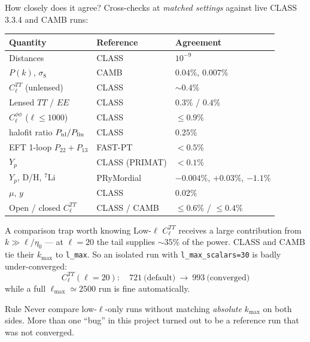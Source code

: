 \documentclass[10pt,aspectratio=43]{beamer}
\newcommand{\cl}{C_\ell}
\begin{document}
\begin{frame}{How closely does it agree?}
  Cross-checks at \emph{matched settings} against live CLASS 3.3.4 and CAMB runs:
  \renewcommand{\arraystretch}{1.2}
  \begin{center}\small
  \begin{tabular}{@{}lll@{}}
    \toprule
    \textbf{Quantity} & \textbf{Reference} & \textbf{Agreement} \\
    \midrule
    Distances                 & CLASS  & $10^{-9}$ \\
    $P(k)$, $\sigma_8$        & CAMB   & $0.04\%$, $0.007\%$ \\
    $\cl^{TT}$ (unlensed)     & CLASS  & $\sim0.4\%$ \\
    Lensed $TT$ / $EE$        & CLASS  & $0.3\%$ / $0.4\%$ \\
    $\cl^{\phi\phi}$ ($\ell\le1000$) & CLASS & $\le0.9\%$ \\
    halofit ratio $P_{\rm nl}/P_{\rm lin}$ & CLASS & $0.25\%$ \\
    EFT 1-loop $P_{22}+P_{13}$ & FAST-PT & $<0.5\%$ \\
    $Y_p$                     & CLASS (PRIMAT) & $<0.1\%$ \\
    $Y_p$, D/H, $^7$Li        & PRyMordial & $-0.004\%$, $+0.03\%$, $-1.1\%$ \\
    $\mu$, $y$                & CLASS  & $0.02\%$ \\
    Open / closed $\cl^{TT}$  & CLASS / CAMB & $\le0.6\%$ / $\le0.4\%$ \\
    \bottomrule
  \end{tabular}
  \end{center}
\end{frame}

\begin{frame}{A comparison trap worth knowing}
  Low-$\ell$ $\cl^{TT}$ receives a large contribution from $k\gg\ell/\eta_0$ ---
  at $\ell=20$ the tail supplies $\sim35\%$ of the power.
  \vfill
  CLASS and CAMB tie their $k_{\max}$ to \texttt{l\_max}. So an isolated run with
  \texttt{l\_max\_scalars=30} is \alert{badly under-converged}:
  \[
    \cl^{TT}(\ell=20):\quad 721\ \text{(default)}\ \longrightarrow\ 993\ \text{(converged)}
  \]
  while a full $\ell_{\max}\simeq2500$ run is fine automatically.
  \vfill
  \begin{block}{Rule}
    Never compare low-$\ell$-only runs without matching \emph{absolute}
    $k_{\max}$ on both sides. More than one ``bug'' in this project turned out
    to be a reference run that was not converged.
  \end{block}
\end{frame}
\end{document}
